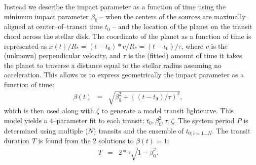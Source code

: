 
Instead we describe the impact parameter as a function of time using the
minimum impact parameter $\beta_0$ -- when the centers of the sources
are maximally aligned at center--of--transit time $t_0$ -- and the
location of the planet on the transit chord across the stellar disk.
The coordinate of the planet as a function of time is represented as
$x(t) / R_* = (t - t_0) * v / R_* = (t - t_0) / \tau$, where $v$ is
the (unknown) perpendicular velocity, and $\tau$ is the (fitted)
amount of time it takes the planet to traverse a distance equal to the
stellar radius assuming no acceleration.  This allows us to express
geometrically the impact parameter as a function of time:
\begin{eqnarray}
\beta(t) & = & \sqrt{\beta_0^2 + \left((t - t_0) / \tau\right)^2},
\end{eqnarray}
which is then used along with $\zeta$ to generate a model transit
lightcurve.
This model yields a 4--parameter fit to each transit: $t_0, \beta_0^2,
\tau, \zeta$.  The system period $P$ is determined using 
multiple ($N$) transits and the ensemble of $t_{0;i=1...N}$.  The
transit duration $T$ is found from the 2 solutions to $\beta(t) = 1$:
\begin{eqnarray}
T & = & 2 * \tau \sqrt{1 - \beta_0^2}.
\label{eq-dt}
\end{eqnarray}

